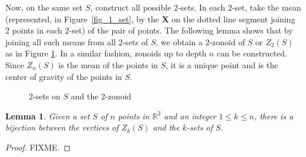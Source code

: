 \documentclass[charterfonts,lotsofwhite]{patmorin}
\newtheorem{lemma}{Lemma}
\newcommand{\comment}[1]{}
\begin{document}
Now, on the same set $S$, construct all possible $2$-sets. In each
$2$-set, take the mean (represented, in Figure~\ref{fig_1_set}, by the
\textbf{X} on the dotted line segment joining 2 points in each
$2$-set) of the pair of points.  The following lemma shows that by
joining all such means from all $2$-sets of $S$, we obtain a
$2$-zonoid of $S$ or $Z_2(S)$ as in Figure \ref{fig_2_set}. In a
similar fashion, zonoids up to depth $n$ can be constructed. Since
$Z_n(S)$ is the mean of the points in $S$, it is a unique point and is
the center of gravity of the points in $S$.

\begin{figure}[ht]
 \begin{center}
   \caption{\label{fig_2_set}$2$-sets on $S$ and the $2$-zonoid}
 \end{center}
\end{figure}

\begin{lemma}\label{lemma_bijection}
Given a set $S$ of $n$ points in $\mathbb{R}^2$ and an integer $1 \le
k \le n$, there is a bijection between the vertices of $Z_k(S)$ and
the $k$-sets of $S$.
\end{lemma}

\begin{proof}
\comment{
Consider the following mapping that takes $k$-sets onto zonoid
vertices.  Let $S'$ be a $k$-set on the right handside of some
oriented line $\ell$, so that $\ell$ separates $S'$ from $S\setminus
S'$. We map $S'$ onto the point $p_{S'}=\sum_{x\in S'}x/k$.  Observe
that $p_S$ is indeed a vertex of $Z_k(S)$ because it is an extreme
point of $Z_k$ in the direction $d$ perpendicular to $\ell$.  We must
prove that this mapping is one-to-one and onto.

\textbf{One-to-one:} Consider a $k$-set in a set $S$ of $n$ points.
Allot $\lambda_i = \frac{1}{k}$ to each point in this $k$-set. This is
in accordance to the definition of a $k$-zonoid in Section
\ref{subsection_definition_of_zonoid_depth_and_regions}. Then
$\sum_{i=1}^{n}\lambda_ip_i$ is the mean of the points in the $k$-set
as well as an extreme point of $Z_k(S)$ in the direction perpendicular
to the line that separates this $k$-set. There can be only one $k$-set
that is extreme in any given direction, and the neighboring $k$-sets
differ by at least one point. Therefore, different $k$-sets correspond
to different $k$-zonoid vertices.

\textbf{Onto:} A $k$-zonoid vertex is extreme in some direction and is
the mean of the points in the $k$-set separated by a line
perpendicular to that direction.  
} FIXME.
\end{proof}
\end{document}
